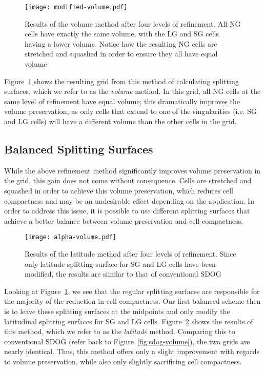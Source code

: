 \begin{figure}[ht!]
	\centering
	\texttt{[image: modified-volume.pdf]}
	\caption[Distribution of cell volumes in the volume modification]{
		Results of the volume method after four levels of refinement.
		All NG cells have exactly the same volume, with the LG and SG cells having a lower volume.
		Notice how the resulting NG cells are stretched and squashed in order to ensure they all have equal volume
	}
	\label{fig:modified-volume}
\end{figure}


Figure~\ref{fig:modified-volume} shows the resulting grid from this method of calculating splitting surfaces, which we refer to as the \textit{volume} method.
In this grid, all NG cells at the same level of refinement have equal volume; this dramatically improves the volume preservation, as only cells that extend to one of the singularities (i.e. SG and LG cells) will have a different volume than the other cells in the grid.


\subsection{Balanced Splitting Surfaces} \label{chap:4:balanced}
While the above refinement method significantly improves volume preservation in the grid, this gain does not come without consequence.
Cells are stretched and squashed in order to achieve this volume preservation, which reduces cell compactness and may be an undesirable effect depending on the application.
In order to address this issue, it is possible to use different splitting surfaces that achieve a better balance between volume preservation and cell compactness.


\begin{figure}[ht!]
	\centering
	\texttt{[image: alpha-volume.pdf]}
	\caption[Distribution of cell volumes in the latitude modification]{
		Results of the latitude method after four levels of refinement.
		Since only latitude splitting surface for SG and LG cells have been modified, the results are similar to that of conventional SDOG
	}
	\label{fig:alpha-volume}
\end{figure}


Looking at Figure~\ref{fig:modified-volume}, we see that the regular splitting surfaces are responsible for the majority of the reduction in cell compactness.
Our first balanced scheme then is to leave these splitting surfaces at the midpoints and only modify the latitudinal splitting surfaces for SG and LG cells.
Figure~\ref{fig:alpha-volume} shows the results of this method, which we refer to as the \textit{latitude} method.
Comparing this to conventional SDOG (refer back to Figure~\ref{fig:sdog-volume}), the two grids are nearly identical.
Thus, this method offers only a slight improvement with regards to volume preservation, while also only slightly sacrificing cell compactness.


